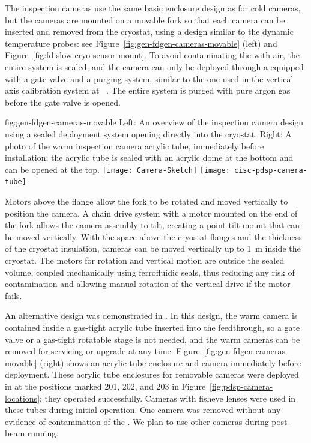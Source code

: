 The inspection cameras use the same basic
enclosure design as for cold cameras, but the cameras are mounted on a movable
fork so that each camera can be inserted and removed from the cryostat,
using a design similar to the dynamic temperature probes: see
 Figure~\ref{fig:gen-fdgen-cameras-movable} (left) and
 Figure~\ref{fig:fd-slow-cryo-sensor-mount}.  To avoid contaminating the
 with air, the entire system is sealed, and the
camera can only be deployed through a \fdth equipped with a gate
valve and a purging system, similar to the one used in the vertical axis
calibration system at \kamland~\cite{Banks:2014hra}. The entire system
is  purged with pure argon gas before the gate valve is opened.

\begin{dunefigure}{fig:gen-fdgen-cameras-movable}
  {Left: An overview of the inspection camera design using a sealed deployment system opening directly into the cryostat. Right: A photo of the  warm inspection camera acrylic tube, immediately before installation; the acrylic tube is sealed with an acrylic dome at the bottom and can be opened at the top.}
  \texttt{[image: Camera-Sketch]}%
  \texttt{[image: cisc-pdsp-camera-tube]}%
\end{dunefigure}

Motors above the flange allow the fork to be rotated and moved vertically to position the camera. 
 A chain drive system with a motor
mounted on the end of the fork allows the camera assembly to tilt, 
creating a point-tilt mount that can be moved vertically.
With the space above the cryostat flanges and the
thickness of the cryostat insulation, cameras can be moved vertically up to
\SI{1}{m} inside the cryostat.
The motors for rotation and vertical motion are outside the sealed
volume, coupled mechanically using ferrofluidic seals, thus reducing any risk of
contamination and allowing manual rotation of the vertical
drive if the motor fails.  

An alternative design was demonstrated in . In this design, the warm camera is contained inside a gas-tight acrylic tube inserted into the feedthrough, so a gate valve or a gas-tight rotatable stage is not needed, and the warm cameras can be removed for servicing or upgrade at any time. Figure~\ref{fig:gen-fdgen-cameras-movable} (right) shows an acrylic tube enclosure and camera immediately before deployment. 
These acrylic tube enclosures for removable cameras were deployed in  at the positions marked 201, 202, and 203 in Figure~\ref{fig:pdsp-camera-locations}; they operated successfully. Cameras with fisheye lenses were used in these tubes during initial operation.  One camera was removed without any evidence of contamination of the . We plan to use other cameras during post-beam running.

